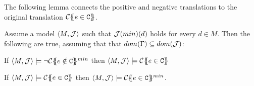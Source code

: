 The following lemma connects the positive and negative translations to
the original translation ${\cal C}\{\!\!\{e \in {\tt C}\}\!\!\}$.

\begin{lemma}\label{lem:contract-min} Assume a model $\langle M,{\cal J}\rangle$ such that ${\cal J}(min)(d)$ holds for every $d \in M$.
Then the following are true, assuming that that $dom(\Gamma) \subseteq dom({\cal J})$:
\begin{itemize*}
  \item If $\langle M,{\cal J}\rangle \models \neg {\cal C}\{\!\!\{e \notin {\tt C}\}\!\!\}^{min}$ then $\langle M,{\cal J}\rangle\models {\cal C}\{\!\!\{e \in {\tt C}\}\!\!\}$
  \item If $\langle M,{\cal J}\rangle \models {\cal C}\{\!\!\{e \in {\tt C}\}\!\!\}$ then $\langle M,{\cal J}\rangle \models {\cal C}\{\!\!\{e \in {\tt C}\}\!\!\}^{min}$.
\end{itemize*}
\end{lemma}

